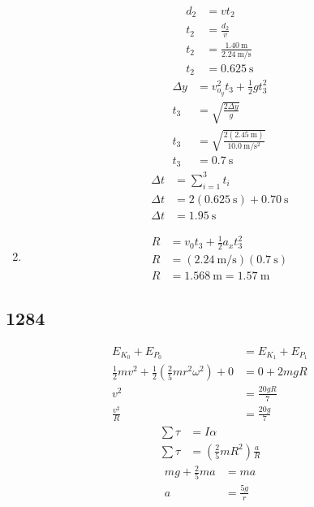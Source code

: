 \documentclass{article}
\begin{document}
\begin{enumerate}[label = \boldalpha]
		\begin{align*}
			d_2 & = vt_2 \\
			t_2 & = \frac{ d_2 }{ v } \\
			t_2 & = \frac{ \SI{1.40}{\meter} }{ \SI{2.24}{\meter \per \second} } \\
			t_2 & = \SI{0.625}{\second}
		\end{align*}
		\begin{align*}
			\Delta y & = v_{o_y}^2t_3 + \frac{1}{2}gt_3^2 \\
			t_3 & = \sqrt{ \frac{ 2\Delta y }{ g } } \\
			t_3 & = \sqrt{ \frac{ 2(\SI{2.45}{\meter}) }{ \SI{10.0}{\meter \per \second \squared} } } \\
			t_3 & = \SI{0.7}{\second}
		\end{align*}
		\begin{align*}
			\Delta t & = \sum_{i = 1}^3 t_i \\
			\Delta t & = 2(\SI{0.625}{\second}) + \SI{0.70}{\second} \\
			\Delta t & = \SI{1.95}{\second}
		\end{align*}
	\item
		\begin{align*}
			R & = v_0t_3 + \frac{1}{2}a_xt_3^2 \\
			R & = (\SI{2.24}{\meter \per \second})(\SI{0.7}{\second}) \\
			R & = \SI{1.568}{\meter} = \SI{1.57}{\meter}
		\end{align*}
\end{enumerate}

\subsection{1284}

\begin{align*}
	E_{K_0} + E_{P_0} & = E_{K_1} + E_{P_1} \\
	\frac{1}{2}mv^2 + \frac{1}{2} \left( \frac{2}{5}mr^2\omega^2 \right) + 0 & = 0 + 2mgR \\
	v^2 & = \frac{20gR}{7} \\
	\frac{v^2}{R} & = \frac{20g}{7}
\end{align*}
\begin{align*}
	\sum \tau & = I\alpha \\
	\sum \tau & = \left( \frac{2}{5}mR^2 \right)\frac{a}{R}
\end{align*}
\begin{align*}
	mg + \frac{2}{5}ma & = ma \\
	a & = \frac{5g}{r}
\end{align*}
\end{document}
